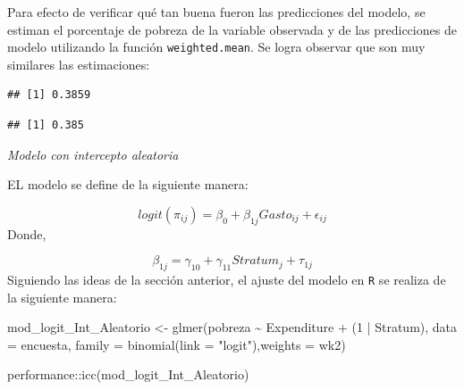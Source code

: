 \documentclass[
  12pt,
]{book}
\newenvironment{Shaded}{\begin{snugshade}}{\end{snugshade}}
\newcommand{\AttributeTok}[1]{\textcolor[rgb]{0.77,0.63,0.00}{#1}}
\newcommand{\DecValTok}[1]{\textcolor[rgb]{0.00,0.00,0.81}{#1}}
\newcommand{\FunctionTok}[1]{\textcolor[rgb]{0.00,0.00,0.00}{#1}}
\newcommand{\NormalTok}[1]{#1}
\newcommand{\OtherTok}[1]{\textcolor[rgb]{0.56,0.35,0.01}{#1}}
\newcommand{\SpecialCharTok}[1]{\textcolor[rgb]{0.00,0.00,0.00}{#1}}
\newcommand{\StringTok}[1]{\textcolor[rgb]{0.31,0.60,0.02}{#1}}
\begin{document}
Para efecto de verificar qué tan buena fueron las predicciones del modelo, se estiman el porcentaje de pobreza de la variable observada y de las predicciones de modelo utilizando la función \texttt{weighted.mean}. Se logra observar que son muy similares las estimaciones:

\begin{Shaded}
\end{Shaded}

\begin{verbatim}
## [1] 0.3859
\end{verbatim}

\begin{Shaded}
\end{Shaded}

\begin{verbatim}
## [1] 0.385
\end{verbatim}

\emph{Modelo con intercepto aleatoria}

EL modelo se define de la siguiente manera:

\[
logit(\pi_{ij})=\beta_{0}+\beta_{1j}Gasto_{ij}+\epsilon_{ij}
\]
Donde,

\[
\beta_{1j} = \gamma_{10}+\gamma_{11}Stratum_{j} + \tau_{1j}
\]
Siguiendo las ideas de la sección anterior, el ajuste del modelo en \texttt{R} se realiza de la siguiente manera:

\begin{Shaded}
\begin{Highlighting}[]
\NormalTok{mod\_logit\_Int\_Aleatorio }\OtherTok{\textless{}{-}} \FunctionTok{glmer}\NormalTok{(pobreza }\SpecialCharTok{\textasciitilde{}}\NormalTok{ Expenditure  }\SpecialCharTok{+}\NormalTok{ (}\DecValTok{1} \SpecialCharTok{|}\NormalTok{ Stratum),}
  \AttributeTok{data =}\NormalTok{ encuesta, }\AttributeTok{family =} \FunctionTok{binomial}\NormalTok{(}\AttributeTok{link =} \StringTok{"logit"}\NormalTok{),}\AttributeTok{weights  =}\NormalTok{  wk2)}

\NormalTok{performance}\SpecialCharTok{::}\FunctionTok{icc}\NormalTok{(mod\_logit\_Int\_Aleatorio)}
\end{Highlighting}
\end{Shaded}
\end{document}
